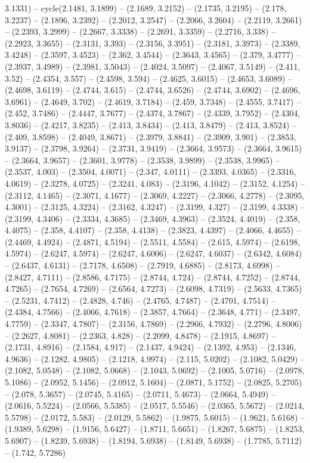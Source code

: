 3.1331) -- cycle(2.1481, 3.1899) -- (2.1689, 3.2152) -- (2.1735, 3.2195) -- (2.178, 3.2237) -- (2.1896, 3.2392) -- (2.2012, 3.2547) -- (2.2066, 3.2604) -- (2.2119, 3.2661) -- (2.2393, 3.2999) -- (2.2667, 3.3338) -- (2.2691, 3.3359) -- (2.2716, 3.338) -- (2.2923, 3.3655) -- (2.3131, 3.393) -- (2.3156, 3.3951) -- (2.3181, 3.3973) -- (2.3389, 3.4248) -- (2.3597, 3.4523) -- (2.362, 3.4544) -- (2.3643, 3.4565) -- (2.379, 3.4777) -- (2.3937, 3.4989) -- (2.3981, 3.5043) -- (2.4024, 3.5097) -- (2.4067, 3.5149) -- (2.411, 3.52) -- (2.4354, 3.557) -- (2.4598, 3.594) -- (2.4625, 3.6015) -- (2.4653, 3.6089) -- (2.4698, 3.6119) -- (2.4744, 3.615) -- (2.4744, 3.6526) -- (2.4744, 3.6902) -- (2.4696, 3.6961) -- (2.4649, 3.702) -- (2.4619, 3.7184) -- (2.459, 3.7348) -- (2.4555, 3.7417) -- (2.452, 3.7486) -- (2.4447, 3.7677) -- (2.4374, 3.7867) -- (2.4339, 3.7952) -- (2.4304, 3.8036) -- (2.4217, 3.8235) -- (2.413, 3.8434) -- (2.413, 3.8479) -- (2.413, 3.8524) -- (2.409, 3.8598) -- (2.4049, 3.8671) -- (2.3979, 3.8841) -- (2.3909, 3.901) -- (2.3853, 3.9137) -- (2.3798, 3.9264) -- (2.3731, 3.9419) -- (2.3664, 3.9573) -- (2.3664, 3.9615) -- (2.3664, 3.9657) -- (2.3601, 3.9778) -- (2.3538, 3.9899) -- (2.3538, 3.9965) -- (2.3537, 4.003) -- (2.3504, 4.0071) -- (2.347, 4.0111) -- (2.3393, 4.0365) -- (2.3316, 4.0619) -- (2.3278, 4.0725) -- (2.3241, 4.083) -- (2.3196, 4.1042) -- (2.3152, 4.1254) -- (2.3112, 4.1465) -- (2.3071, 4.1677) -- (2.3069, 4.2227) -- (2.3066, 4.2778) -- (2.3095, 4.3001) -- (2.3125, 4.3224) -- (2.3162, 4.3247) -- (2.3199, 4.327) -- (2.3199, 4.3338) -- (2.3199, 4.3406) -- (2.3334, 4.3685) -- (2.3469, 4.3963) -- (2.3524, 4.4019) -- (2.358, 4.4075) -- (2.358, 4.4107) -- (2.358, 4.4138) -- (2.3823, 4.4397) -- (2.4066, 4.4655) -- (2.4469, 4.4924) -- (2.4871, 4.5194) -- (2.5511, 4.5584) -- (2.615, 4.5974) -- (2.6198, 4.5974) -- (2.6247, 4.5974) -- (2.6247, 4.6006) -- (2.6247, 4.6037) -- (2.6342, 4.6084) -- (2.6437, 4.6131) -- (2.7178, 4.6508) -- (2.7919, 4.6885) -- (2.8173, 4.6998) -- (2.8427, 4.7111) -- (2.8586, 4.7175) -- (2.8744, 4.724) -- (2.8744, 4.7252) -- (2.8744, 4.7265) -- (2.7654, 4.7269) -- (2.6564, 4.7273) -- (2.6098, 4.7319) -- (2.5633, 4.7365) -- (2.5231, 4.7412) -- (2.4828, 4.746) -- (2.4765, 4.7487) -- (2.4701, 4.7514) -- (2.4384, 4.7566) -- (2.4066, 4.7618) -- (2.3857, 4.7664) -- (2.3648, 4.771) -- (2.3497, 4.7759) -- (2.3347, 4.7807) -- (2.3156, 4.7869) -- (2.2966, 4.7932) -- (2.2796, 4.8006) -- (2.2627, 4.8081) -- (2.2363, 4.828) -- (2.2099, 4.8478) -- (2.1915, 4.8697) -- (2.1731, 4.8916) -- (2.1584, 4.917) -- (2.1437, 4.9424) -- (2.1392, 4.953) -- (2.1346, 4.9636) -- (2.1282, 4.9805) -- (2.1218, 4.9974) -- (2.115, 5.0202) -- (2.1082, 5.0429) -- (2.1082, 5.0548) -- (2.1082, 5.0668) -- (2.1043, 5.0692) -- (2.1005, 5.0716) -- (2.0978, 5.1086) -- (2.0952, 5.1456) -- (2.0912, 5.1604) -- (2.0871, 5.1752) -- (2.0825, 5.2705) -- (2.078, 5.3657) -- (2.0745, 5.4165) -- (2.0711, 5.4673) -- (2.0664, 5.4949) -- (2.0616, 5.5224) -- (2.0566, 5.5385) -- (2.0517, 5.5546) -- (2.0365, 5.5672) -- (2.0214, 5.5798) -- (2.0172, 5.583) -- (2.0129, 5.5862) -- (1.9875, 5.6015) -- (1.9621, 5.6168) -- (1.9389, 5.6298) -- (1.9156, 5.6427) -- (1.8711, 5.6651) -- (1.8267, 5.6875) -- (1.8253, 5.6907) -- (1.8239, 5.6938) -- (1.8194, 5.6938) -- (1.8149, 5.6938) -- (1.7785, 5.7112) -- (1.742, 5.7286) 